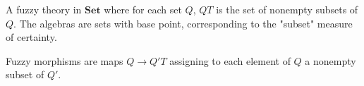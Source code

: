 A fuzzy theory in $\mathbf{Set}$ where for each set $Q$, $QT$ is the set of nonempty subsets of $Q$. The algebras are sets with base point, corresponding to the "subset" measure of certainty.

Fuzzy morphisms are maps $Q \to Q'T$ assigning to each element of $Q$ a nonempty subset of $Q'$.


